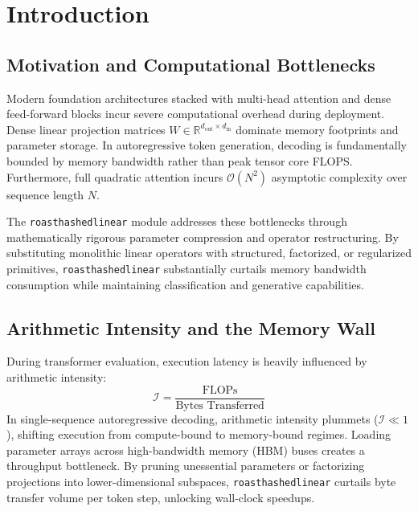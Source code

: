 \section{Introduction}

\subsection{Motivation and Computational Bottlenecks}
Modern foundation architectures stacked with multi-head attention and dense feed-forward blocks incur severe computational overhead during deployment. Dense linear projection matrices $W \in \mathbb{R}^{d_{\text{out}} \times d_{\text{in}}}$ dominate memory footprints and parameter storage. In autoregressive token generation, decoding is fundamentally bounded by memory bandwidth rather than peak tensor core FLOPS. Furthermore, full quadratic attention incurs $\mathcal{O}(N^2)$ asymptotic complexity over sequence length $N$.

The \texttt{roasthashedlinear} module addresses these bottlenecks through mathematically rigorous parameter compression and operator restructuring. By substituting monolithic linear operators with structured, factorized, or regularized primitives, \texttt{roasthashedlinear} substantially curtails memory bandwidth consumption while maintaining classification and generative capabilities.

\subsection{Arithmetic Intensity and the Memory Wall}
During transformer evaluation, execution latency is heavily influenced by arithmetic intensity:
\[
\mathcal{I} = \frac{\text{FLOPs}}{\text{Bytes Transferred}}
\]
In single-sequence autoregressive decoding, arithmetic intensity plummets ($\mathcal{I} \ll 1$), shifting execution from compute-bound to memory-bound regimes. Loading parameter arrays across high-bandwidth memory (HBM) buses creates a throughput bottleneck. By pruning unessential parameters or factorizing projections into lower-dimensional subspaces, \texttt{roasthashedlinear} curtails byte transfer volume per token step, unlocking wall-clock speedups.

